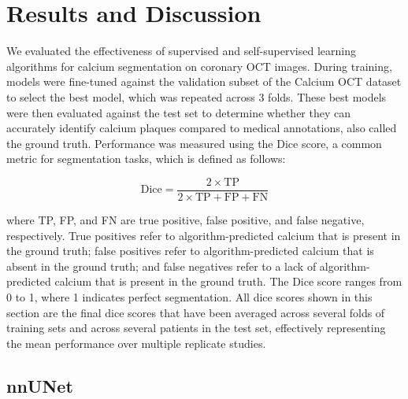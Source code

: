 \documentclass[a4paper,11pt,oneside]{report}
\begin{document}
\chapter{Results and Discussion}


We evaluated the effectiveness of supervised and self-supervised learning algorithms for calcium segmentation on coronary OCT images. During training, models were fine-tuned against the validation subset of the Calcium OCT dataset to select the best model, which was repeated across 3 folds. These best models were then evaluated against the test set to determine whether they can accurately identify calcium plaques compared to medical annotations, also called the ground truth. Performance was measured using the Dice score, a common metric for segmentation tasks, which is defined as follows:

\begin{equation}
    \text{Dice} = \frac{2 \times \text{TP}}{2 \times \text{TP} + \text{FP} + \text{FN}}
\end{equation}

where TP, FP, and FN are true positive, false positive, and false negative, respectively. True positives refer to algorithm-predicted calcium that is present in the ground truth; false positives refer to algorithm-predicted calcium that is absent in the ground truth; and false negatives refer to a lack of algorithm-predicted calcium that is present in the ground truth. The Dice score ranges from 0 to 1, where 1 indicates perfect segmentation. All dice scores shown in this section are the final dice scores that have been averaged across several folds of training sets and across several patients in the test set, effectively representing the mean performance over multiple replicate studies. %

\section{nnUNet}\label{sec:result:nnunet}
\end{document}
